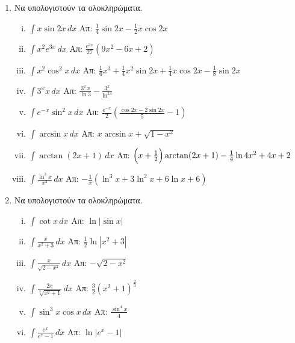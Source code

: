 \begin{enumerate}
  \item Να υπολογιστούν τα ολοκληρώματα.
    \begin{enumerate}[i)]
      \item $\int x\sin2x \, dx$ \hfill Απ: $\frac{1}{4}\sin2x-\frac{1}{2}x\cos2x$
      \item $\int x^2e^{3x} \, dx$ \hfill Απ: $\frac{e^{3x}}{27}(9x^2-6x+2)$
      \item $\int x^2\cos^2x \, dx$ 
        \hfill Απ: $\frac{1}{6}x^3 + \frac{1}{4}x^2\sin2x+\frac{1}{4}x\cos2x-\frac{1}{8}
        \sin2x$
      \item $\int 3^{x}x \, dx$ \hfill Απ: $\frac{3^xx}{\ln3}-\frac{3^x}{\ln^23}$
      \item $\int e^{-x}\sin^2x \, dx$ 
        \hfill Απ: $\frac{e^{-x}}{2}\left(\frac{\cos2x-2\sin2x}{5}-1\right)$
      \item $\int \arcsin x \, dx$ \hfill Απ: $x\arcsin x + \sqrt{1-x^2}$
      \item $ \int \arctan(2x+1) \,{dx} $ 
        \hfill Απ: $ \Bigl(x+ \frac{1}{2}\Bigr) \arctan(2x+1)-\frac{1}{4} 
        \ln{4x^{2} + 4x +2} $
      \item $\int \frac{\ln^3x}{x^2} \, dx$ 
        \hfill Απ: $-\frac{1}{x}(\ln^3x+3\ln^2x+6\ln x+6)$
    \end{enumerate}

  \item Να υπολογιστούν τα ολοκληρώματα.
    \begin{enumerate}[i)]
      \item $\int \cot x \, dx$ \hfill Απ: $\ln|\sin x|$
      \item $\int\frac{x}{x^2+3} \, dx$ \hfill Απ: $\frac{1}{2}\ln|x^2+3|$
      \item $\int\frac{x}{\sqrt{2-x^{2}}} \, dx$ \hfill Απ: $ -\sqrt{2-x^{2}} $
      \item $ \int \frac{2x}{\sqrt[3]{x^{2}+1}} \,{dx} $ 
        \hfill Απ: $ \frac{3}{2} (x^{2}+1)^{\frac{2}{3}} $ 
      \item $\int \sin^3x\cos x \, dx$ \hfill Απ: $\frac{\sin^4x}{4}$
      \item $\int \frac{e^x}{e^x-1} \, dx$ \hfill Απ: $\ln|e^x-1|$
    \end{enumerate}
\end{enumerate}






